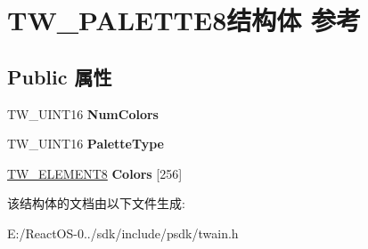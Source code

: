 \hypertarget{struct_t_w___p_a_l_e_t_t_e8}{}\section{T\+W\+\_\+\+P\+A\+L\+E\+T\+T\+E8结构体 参考}
\label{struct_t_w___p_a_l_e_t_t_e8}
\subsection*{Public 属性}
\begin{DoxyCompactItemize}
\item 
\mbox{\label{struct_t_w___p_a_l_e_t_t_e8_a259a758ac7cc5ca7b7e40f45ff23d615}} 
T\+W\+\_\+\+U\+I\+N\+T16 {\bfseries Num\+Colors}
\item 
\mbox{\label{struct_t_w___p_a_l_e_t_t_e8_aa11498091186dca4673732a552bdd81a}} 
T\+W\+\_\+\+U\+I\+N\+T16 {\bfseries Palette\+Type}
\item 
\mbox{\label{struct_t_w___p_a_l_e_t_t_e8_a981dcaaf72770ea9f39b260daeb8fd12}} 
\hyperlink{struct_t_w___e_l_e_m_e_n_t8}{T\+W\+\_\+\+E\+L\+E\+M\+E\+N\+T8} {\bfseries Colors} \mbox{[}256\mbox{]}
\end{DoxyCompactItemize}


该结构体的文档由以下文件生成\+:\begin{DoxyCompactItemize}
\item 
E\+:/\+React\+O\+S-\/0../sdk/include/psdk/twain.\+h\end{DoxyCompactItemize}

